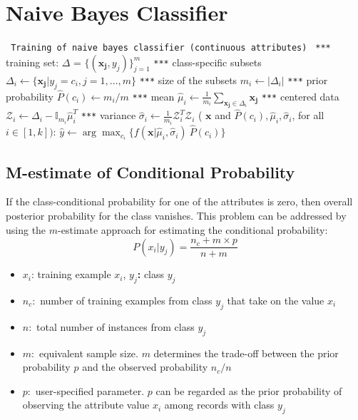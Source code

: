 \documentclass{article}
\newcommand{\argmax}{\arg\!\max}
\begin{document}
\section*{Naive Bayes Classifier}
{\small
\begin{center}
\begin{algorithmic}[1]\label{alg:naiveBayes}
 \texttt{ Training of naive bayes classifier (continuous attributes) }
\State  \texttt{***} \textsf{training set:} $\Delta$ = $ \{ (\mathbf{x_j}, y_j)\}_{j=1}^{m}$
\State  \texttt{***}  \textsf{class-specific subsets}
\State $\Delta_i \leftarrow \{\mathbf{ x_j} | y_j =c_i, j=1,\ldots,m\}$
\State  \texttt{***}  \textsf{size of the subsets}
\State $m_i \leftarrow | \Delta_i|$
\State  \texttt{***}  \textsf{prior probability}
\State $\hat{P}(c_i) \leftarrow m_i/m$
\State  \texttt{***}  \textsf{mean}
\State  $\hat{\mu}_i \leftarrow \frac{1}{m_i} \sum_{\mathbf{x_j}\in\Delta_i} \mathbf{x_j} $
\State  \texttt{***}  \textsf{centered data}
\State $\mathcal{Z}_i \leftarrow \Delta_i -  \mathbb{I}_{m_i} \hat{\mu}_i^T $
\State  \texttt{***}  \textsf{variance}
\State  $\hat{\sigma}_i \leftarrow \frac{1}{m_i} \mathcal{Z}_i^T \mathcal{Z}_i$
\EndFor
\State {}
\State
{}( $\mathbf{x}$ and  $\hat{P}(c_i), \hat{\mu}_i, \hat{\sigma}_i$, for all $i \in [1,k])$:
\State $\hat{y} \leftarrow \argmax_{c_i} \{ f(\mathbf{x} | \hat{\mu}_i, \hat{\sigma}_i)\ \hat{P}(c_i) \} $
\State {}
\end{algorithmic}
\end{center}}

\pagebreak
\subsection*{M-estimate of Conditional Probability}
If the class-conditional probability for one of the attributes is zero, then overall posterior probability for the class vanishes. This problem can be addressed by using the $m$-estimate approach for estimating the conditional probability:
\begin{equation*}
P(x_i | y_j) =  \frac{n_c + m \times p}{n+m}
\end{equation*}


\begin{itemize}
\item $x_i$: training example $x_i$, \textbf{$y_j$:} class $y_j$
\item $n_c: $ number of training examples from class $y_j$ that take on the value $x_i$
\item $n:$ total number of instances from class $y_j$
\item $m:$ equivalent sample size. $m$ determines the trade-off between the prior probability $p$ and the observed probability $n_c/n$
\item $p:$ user-specified parameter. $p$ can be regarded as the prior probability of observing the attribute value $x_i$ among records with class $y_j$
\end{itemize}
\end{document}
